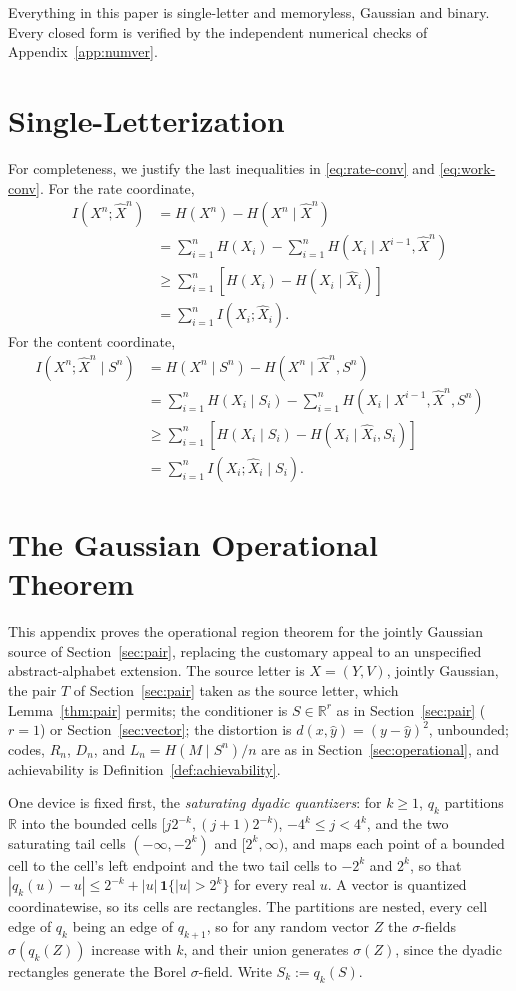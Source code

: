 \documentclass[11pt,onecolumn]{IEEEtran}
\newcommand{\R}{\mathbb{R}}
\newcommand{\hX}{\widehat{X}}
\newcommand{\hXn}{\widehat{X}^{n}}
\begin{document}
Everything in this paper is single-letter and memoryless, Gaussian and
binary. Every closed form is verified by the independent numerical checks of
Appendix~\ref{app:numver}.

\appendices
\section{Single-Letterization}
\label{app:converse}

For completeness, we justify the last inequalities in
\eqref{eq:rate-conv} and \eqref{eq:work-conv}. For the rate coordinate,
\begin{align}
 I(X^n;\hXn)
 &=H(X^n)-H(X^n\mid\hXn)\nonumber\\
 &=\sum_{i=1}^{n}H(X_i)
   -\sum_{i=1}^{n}H(X_i\mid X^{i-1},\hXn)\nonumber\\
 &\ge\sum_{i=1}^{n}\left[H(X_i)-H(X_i\mid\hX_i)\right]\nonumber\\
 &=\sum_{i=1}^{n}I(X_i;\hX_i).
\end{align}
For the content coordinate,
\begin{align}
 I(X^n;\hXn\mid S^n)
 &=H(X^n\mid S^n)-H(X^n\mid\hXn,S^n)\nonumber\\
 &=\sum_{i=1}^{n}H(X_i\mid S_i)
   -\sum_{i=1}^{n}H(X_i\mid X^{i-1},\hXn,S^n)\nonumber\\
 &\ge\sum_{i=1}^{n}
 \left[H(X_i\mid S_i)-H(X_i\mid\hX_i,S_i)\right]\nonumber\\
 &=\sum_{i=1}^{n}I(X_i;\hX_i\mid S_i).
\end{align}

\section{The Gaussian Operational Theorem}
\label{app:gaussian}

This appendix proves the operational region theorem for the jointly
Gaussian source of Section~\ref{sec:pair}, replacing the customary
appeal to an unspecified abstract-alphabet extension. The source letter
is $X=(Y,V)$, jointly Gaussian, the pair $T$ of Section~\ref{sec:pair}
taken as the source letter, which Lemma~\ref{thm:pair} permits; the
conditioner is $S\in\R^r$ as in
Section~\ref{sec:pair} ($r=1$) or Section~\ref{sec:vector}; the
distortion is
$d(x,\hat y)=(y-\hat y)^2$, unbounded; codes, $R_n$, $D_n$, and
$L_n=H(M\mid S^n)/n$ are as in Section~\ref{sec:operational}, and
achievability is Definition~\ref{def:achievability}.

One device is fixed first, the \emph{saturating dyadic quantizers}:
for $k\ge1$, $q_k$ partitions $\R$ into the bounded cells
$[j2^{-k},(j+1)2^{-k})$, $-4^k\le j<4^k$, and the two saturating tail
cells $(-\infty,-2^k)$ and $[2^k,\infty)$, and maps each point of a
bounded cell to the cell's left endpoint and the two tail cells to
$-2^k$ and $2^k$, so that $|q_k(u)-u|\le2^{-k}+|u|\,\mathbf 1\{|u|>2^k\}$
for every real $u$. A vector is quantized coordinatewise, so its cells
are rectangles. The partitions are nested, every cell edge of $q_k$
being an edge of $q_{k+1}$, so for any random vector $Z$ the
$\sigma$-fields $\sigma(q_k(Z))$ increase with $k$, and their union
generates $\sigma(Z)$, since the dyadic rectangles generate the Borel
$\sigma$-field. Write $S_k:=q_k(S)$.
\end{document}
